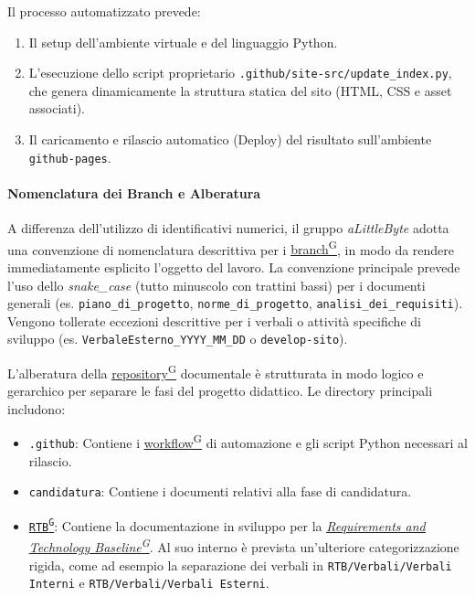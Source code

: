\documentclass[a4paper,12pt]{article}
\providecommand{\glslink}[2]{\href{https://alittlebyte-19.github.io/Documentazione/glossario.html\#gls-#1}{\underline{#2}\textsuperscript{\scriptsize G}}}
\begin{document}
Il processo automatizzato prevede:
\begin{enumerate}
    \item Il setup dell'ambiente virtuale e del linguaggio Python.
    \item L'esecuzione dello script proprietario \texttt{.github/site-src/update\_index.py}, che genera dinamicamente la struttura statica del sito (HTML, CSS e asset associati).
    \item Il caricamento e rilascio automatico (Deploy) del risultato sull'ambiente \texttt{github-pages}.
\end{enumerate}

\paragraph{Nomenclatura dei Branch e Alberatura}
A differenza dell'utilizzo di identificativi numerici, il gruppo \textit{aLittleByte} adotta una convenzione di nomenclatura descrittiva per i \glslink{branch}{branch}, in modo da rendere immediatamente esplicito l'oggetto del lavoro.
La convenzione principale prevede l'uso dello \textit{snake\_case} (tutto minuscolo con trattini bassi) per i documenti generali (es. \texttt{piano\_di\_progetto}, \texttt{norme\_di\_progetto}, \texttt{analisi\_dei\_requisiti}). Vengono tollerate eccezioni descrittive per i verbali o attività specifiche di sviluppo (es. \texttt{VerbaleEsterno\_YYYY\_MM\_DD} o \texttt{develop-sito}).

L'alberatura della \glslink{repository}{repository} documentale è strutturata in modo logico e gerarchico per separare le fasi del progetto didattico. Le directory principali includono:
\begin{itemize}
    \item \texttt{.github}: Contiene i \glslink{workflow}{workflow} di automazione e gli script Python necessari al rilascio.
    \item \texttt{candidatura}: Contiene i documenti relativi alla fase di candidatura.
    \item \texttt{\glslink{rtb-requirements-and-technology-baseline}{RTB}}: Contiene la documentazione in sviluppo per la \textit{\glslink{rtb-requirements-and-technology-baseline}{Requirements and Technology Baseline}}. Al suo interno è prevista un'ulteriore categorizzazione rigida, come ad esempio la separazione dei verbali in \texttt{RTB/Verbali/Verbali Interni} e \texttt{RTB/Verbali/Verbali Esterni}.
\end{itemize}
\end{document}
